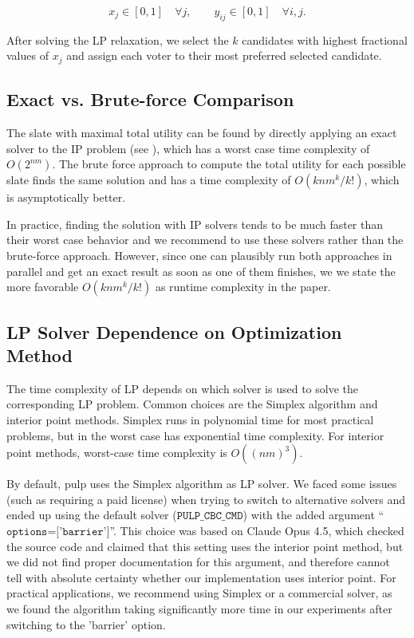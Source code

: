 \documentclass[11pt]{article}
\begin{document}
\[
x_j \in [0,1] \quad \forall j,
\qquad
y_{ij} \in [0,1] \quad \forall i,j.
\]

After solving the LP relaxation, we select the $k$ candidates with highest fractional values of $x_j$ and assign each voter to their most preferred selected candidate.

\subsection{Exact vs. Brute-force Comparison}
The slate with maximal total utility can be found by directly applying an exact solver to the IP problem (see ), which has a worst case time complexity of $O(2^{nm})$. The brute force approach to compute the total utility for each possible slate finds the same solution and has a time complexity of $O(knm^k/k!)$, which is asymptotically better.

In practice, finding the solution with IP solvers tends to be much faster than their worst case behavior and we recommend to use these solvers rather than the brute-force approach. However, since one can plausibly run both approaches in parallel and get an exact result as soon as one of them finishes, we we state the more favorable $O(knm^k/k!)$ as runtime complexity in the paper.

\subsection{LP Solver Dependence on Optimization Method}
The time complexity of LP depends on which solver is used to solve the corresponding LP problem.
Common choices are the Simplex algorithm \citep{nelder1965simplex} and interior point methods.
Simplex runs in polynomial time for most practical problems, but in the worst case has exponential time complexity.
For interior point methods, worst-case time complexity is $O((nm)^3)$.

By default, pulp uses the Simplex algorithm as LP solver. We faced some issues (such as requiring a paid license) when trying to switch to alternative solvers and ended up using the default solver ($\texttt{PULP\_CBC\_CMD}$) with the added argument ``$\texttt{options=['barrier']}$''.
This choice was based on Claude Opus 4.5, which checked the source code and claimed that this setting uses the interior point method,
but we did not find proper documentation for this argument, and therefore cannot tell with absolute certainty whether our implementation uses interior point.
For practical applications, we recommend using Simplex or a commercial solver, as we found the algorithm taking significantly more time in our experiments after switching to the 'barrier' option.
\end{document}
